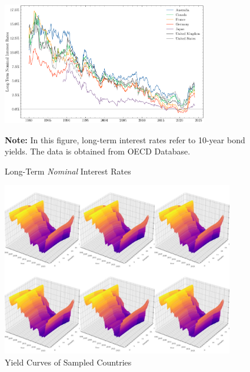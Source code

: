 \begin{figure}[H]
    \centering
    \caption{Long-Term \textit{Nominal} Interest Rates}
    \includegraphics[width=0.8\textwidth]{figures/long-term-rates.png}
    
    \vspace{15pt}
    
    \begin{minipage}{\textwidth}
        \footnotesize %
        \textbf{Note:} In this figure, long-term interest rates refer to 10-year bond yields. The data is obtained from OECD Database.
    \end{minipage}
    \label{fig:long-term-rates}
\end{figure}

\begin{figure}[H]
    \centering
    \caption{Yield Curves of Sampled Countries}
    \includegraphics[width=0.9\textwidth]{figures/ycs.jpg}
\end{figure}

\newpage

